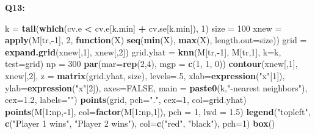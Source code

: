 \documentclass[]{article}
\newenvironment{Shaded}{\begin{snugshade}}{\end{snugshade}}
\newcommand{\KeywordTok}[1]{\textcolor[rgb]{0.13,0.29,0.53}{\textbf{#1}}}
\newcommand{\DataTypeTok}[1]{\textcolor[rgb]{0.13,0.29,0.53}{#1}}
\newcommand{\DecValTok}[1]{\textcolor[rgb]{0.00,0.00,0.81}{#1}}
\newcommand{\FloatTok}[1]{\textcolor[rgb]{0.00,0.00,0.81}{#1}}
\newcommand{\StringTok}[1]{\textcolor[rgb]{0.31,0.60,0.02}{#1}}
\newcommand{\OtherTok}[1]{\textcolor[rgb]{0.56,0.35,0.01}{#1}}
\newcommand{\ControlFlowTok}[1]{\textcolor[rgb]{0.13,0.29,0.53}{\textbf{#1}}}
\newcommand{\OperatorTok}[1]{\textcolor[rgb]{0.81,0.36,0.00}{\textbf{#1}}}
\newcommand{\NormalTok}[1]{#1}
\begin{document}
\textbf{Q13:}

\begin{Shaded}
\begin{Highlighting}[]
\NormalTok{k =}\StringTok{ }\KeywordTok{tail}\NormalTok{(}\KeywordTok{which}\NormalTok{(cv.e }\OperatorTok{<}\StringTok{ }\NormalTok{cv.e[k.min] }\OperatorTok{+}\StringTok{ }\NormalTok{cv.se[k.min]), }\DecValTok{1}\NormalTok{)}
\NormalTok{size =}\StringTok{ }\DecValTok{100}
\NormalTok{xnew =}\StringTok{ }\KeywordTok{apply}\NormalTok{(M[tr,}\OperatorTok{-}\DecValTok{1}\NormalTok{], }\DecValTok{2}\NormalTok{, }\ControlFlowTok{function}\NormalTok{(X) }\KeywordTok{seq}\NormalTok{(}\KeywordTok{min}\NormalTok{(X), }\KeywordTok{max}\NormalTok{(X), }\DataTypeTok{length.out=}\NormalTok{size))}
\NormalTok{grid =}\StringTok{ }\KeywordTok{expand.grid}\NormalTok{(xnew[,}\DecValTok{1}\NormalTok{], xnew[,}\DecValTok{2}\NormalTok{])}
\NormalTok{grid.yhat =}\StringTok{ }\KeywordTok{knn}\NormalTok{(M[tr,}\OperatorTok{-}\DecValTok{1}\NormalTok{], M[tr,}\DecValTok{1}\NormalTok{], }\DataTypeTok{k=}\NormalTok{k, }\DataTypeTok{test=}\NormalTok{grid)}
\NormalTok{np =}\StringTok{ }\DecValTok{300}
\KeywordTok{par}\NormalTok{(}\DataTypeTok{mar=}\KeywordTok{rep}\NormalTok{(}\DecValTok{2}\NormalTok{,}\DecValTok{4}\NormalTok{), }\DataTypeTok{mgp =} \KeywordTok{c}\NormalTok{(}\DecValTok{1}\NormalTok{, }\DecValTok{1}\NormalTok{, }\DecValTok{0}\NormalTok{))}
\KeywordTok{contour}\NormalTok{(xnew[,}\DecValTok{1}\NormalTok{], xnew[,}\DecValTok{2}\NormalTok{], }\DataTypeTok{z =} \KeywordTok{matrix}\NormalTok{(grid.yhat, size), }\DataTypeTok{levels=}\NormalTok{.}\DecValTok{5}\NormalTok{, }
        \DataTypeTok{xlab=}\KeywordTok{expression}\NormalTok{(}\StringTok{"x"}\NormalTok{[}\DecValTok{1}\NormalTok{]), }\DataTypeTok{ylab=}\KeywordTok{expression}\NormalTok{(}\StringTok{"x"}\NormalTok{[}\DecValTok{2}\NormalTok{]), }\DataTypeTok{axes=}\OtherTok{FALSE}\NormalTok{,}
        \DataTypeTok{main =} \KeywordTok{paste0}\NormalTok{(k,}\StringTok{"-nearest neighbors"}\NormalTok{), }\DataTypeTok{cex=}\FloatTok{1.2}\NormalTok{, }\DataTypeTok{labels=}\StringTok{""}\NormalTok{)}
\KeywordTok{points}\NormalTok{(grid, }\DataTypeTok{pch=}\StringTok{"."}\NormalTok{, }\DataTypeTok{cex=}\DecValTok{1}\NormalTok{, }\DataTypeTok{col=}\NormalTok{grid.yhat)}
\KeywordTok{points}\NormalTok{(M[}\DecValTok{1}\OperatorTok{:}\NormalTok{np,}\OperatorTok{-}\DecValTok{1}\NormalTok{], }\DataTypeTok{col=}\KeywordTok{factor}\NormalTok{(M[}\DecValTok{1}\OperatorTok{:}\NormalTok{np,}\DecValTok{1}\NormalTok{]), }\DataTypeTok{pch =} \DecValTok{1}\NormalTok{, }\DataTypeTok{lwd =} \FloatTok{1.5}\NormalTok{)}
\KeywordTok{legend}\NormalTok{(}\StringTok{"topleft"}\NormalTok{, }\KeywordTok{c}\NormalTok{(}\StringTok{"Player 1 wins"}\NormalTok{, }\StringTok{"Player 2 wins"}\NormalTok{), }
       \DataTypeTok{col=}\KeywordTok{c}\NormalTok{(}\StringTok{"red"}\NormalTok{, }\StringTok{"black"}\NormalTok{), }\DataTypeTok{pch=}\DecValTok{1}\NormalTok{)}
\KeywordTok{box}\NormalTok{()}
\end{Highlighting}
\end{Shaded}
\end{document}
